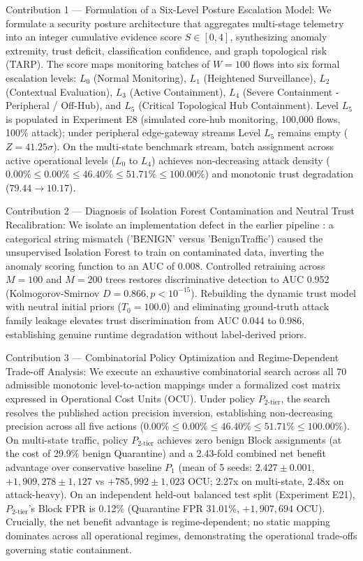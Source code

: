 \documentclass[journal,10pt,onecolumn]{IEEEtran}
\begin{document}
Contribution 1 — Formulation of a Six-Level Posture Escalation Model:
We formulate a security posture architecture that aggregates multi-stage telemetry into an integer cumulative evidence score $S \in [0, 4]$, synthesizing anomaly extremity, trust deficit, classification confidence, and graph topological risk (TARP). The score maps monitoring batches of $W=100$ flows into six formal escalation levels: $L_0$ (Normal Monitoring), $L_1$ (Heightened Surveillance), $L_2$ (Contextual Evaluation), $L_3$ (Active Containment), $L_4$ (Severe Containment - Peripheral / Off-Hub), and $L_5$ (Critical Topological Hub Containment). Level $L_5$ is populated in Experiment E8 (simulated core-hub monitoring, 100,000 flows, 100\% attack); under peripheral edge-gateway streams Level $L_5$ remains empty ($Z = 41.25\sigma$). On the multi-state benchmark stream, batch assignment across active operational levels ($L_0$ to $L_4$) achieves non-decreasing attack density ($0.00\% \le 0.00\% \le 46.40\% \le 51.71\% \le 100.00\%$) and monotonic trust degradation ($79.44 \to 10.17$).

Contribution 2 — Diagnosis of Isolation Forest Contamination and Neutral Trust Recalibration:
We isolate an implementation defect in the earlier pipeline \cite{1}: a categorical string mismatch ('BENIGN' versus 'BenignTraffic') caused the unsupervised Isolation Forest to train on contaminated data, inverting the anomaly scoring function to an AUC of 0.008. Controlled retraining across $M=100$ and $M=200$ trees restores discriminative detection to AUC 0.952 (Kolmogorov-Smirnov $D = 0.866, p < 10^{-15}$). Rebuilding the dynamic trust model with neutral initial priors ($T_0 = 100.0$) and eliminating ground-truth attack family leakage elevates trust discrimination from AUC 0.044 to 0.986, establishing genuine runtime degradation without label-derived priors.

Contribution 3 — Combinatorial Policy Optimization and Regime-Dependent Trade-off Analysis:
We execute an exhaustive combinatorial search across all 70 admissible monotonic level-to-action mappings under a formalized cost matrix expressed in Operational Cost Units (OCU). Under policy $P_{2\text{-tier}}$, the search resolves the published action precision inversion, establishing non-decreasing precision across all five actions ($0.00\% \le 0.00\% \le 46.40\% \le 51.71\% \le 100.00\%$). On multi-state traffic, policy $P_{2\text{-tier}}$ achieves zero benign Block assignments (at the cost of 29.9\% benign Quarantine) and a 2.43-fold combined net benefit advantage over conservative baseline $P_1$ (mean of 5 seeds: $2.427 \pm 0.001$, $+1,909,278 \pm 1,127$ vs $+785,992 \pm 1,023$ OCU; 2.27x on multi-state, 2.48x on attack-heavy). On an independent held-out balanced test split (Experiment E21), $P_{2\text{-tier}}$'s Block FPR is 0.12\% (Quarantine FPR 31.01\%, $+1,907,694$ OCU). Crucially, the net benefit advantage is regime-dependent; no static mapping dominates across all operational regimes, demonstrating the operational trade-offs governing static containment.
\end{document}
